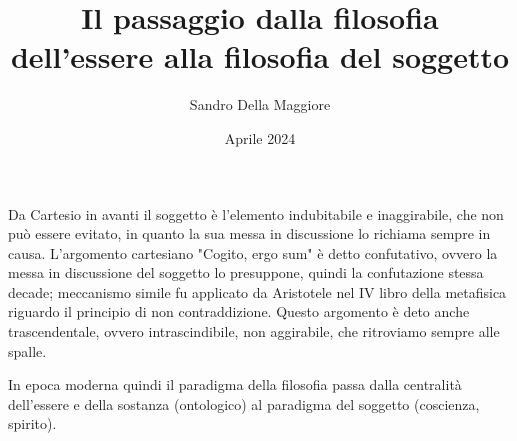 \documentclass[a4paper,12pt,oneside]{article}%
\begin{document}
	\author{Sandro Della Maggiore}
	\title{Il passaggio dalla filosofia dell'essere alla filosofia del soggetto}
	\date{Aprile 2024}
	
	\maketitle

Da Cartesio in avanti il soggetto è l'elemento indubitabile e inaggirabile, che non può essere evitato, in quanto la sua messa in discussione lo richiama sempre in causa. L'argomento cartesiano "Cogito, ergo sum" è detto confutativo, ovvero la messa in discussione del soggetto lo presuppone, quindi la confutazione stessa decade; meccanismo simile fu applicato da Aristotele nel IV libro della metafisica riguardo il principio di non contraddizione. Questo argomento è deto anche trascendentale, ovvero intrascindibile, non aggirabile, che ritroviamo sempre alle spalle.

In epoca moderna quindi il paradigma della filosofia passa dalla centralità dell'essere e della sostanza (ontologico) al paradigma del soggetto (coscienza, spirito).
	
\end{document}
